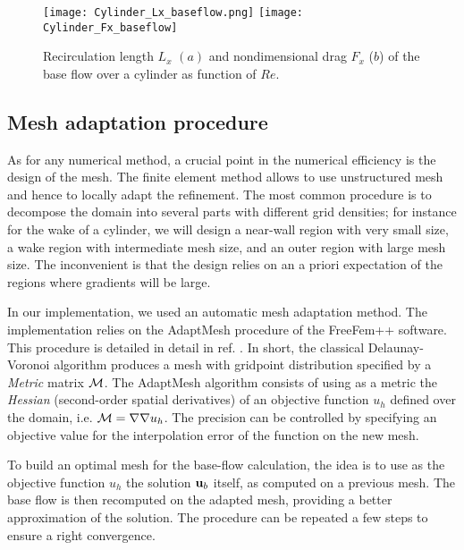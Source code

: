\documentclass[twocolumn,10pt]{asme2ej}
\begin{document}
\begin{figure}
\texttt{[image: Cylinder\_Lx\_baseflow.png]}
\texttt{[image: Cylinder\_Fx\_baseflow]}
\caption{Recirculation length $L_x$ $(a)$  and nondimensional drag $F_x$ ($b$) of the base flow over a cylinder as function of $Re$.}
\label{fig:LxandDrag}
\end{figure}




\subsection{Mesh adaptation procedure}
\vspace{.2cm}

As for any numerical method, a crucial point in the numerical efficiency is the design of the mesh. The finite element method allows to use unstructured mesh and hence to locally adapt the refinement. %
The most common procedure is to decompose the domain into several parts with different grid densities; for instance for the wake of a cylinder, we will design a near-wall region with very small  size, a wake region with intermediate mesh size, and an outer region with large mesh size. The inconvenient is that the design relies on an a priori expectation of the regions where gradients will be large. 

In our implementation, we used an automatic mesh adaptation method. %
The implementation relies on the AdaptMesh procedure of the FreeFem++ software. This procedure is detailed in detail in ref. \cite{adapt}. 
In short, the classical Delaunay-Voronoi algorithm produces a mesh with gridpoint distribution specified by a {\em Metric } matrix $\cal M$. The AdaptMesh algorithm consists of using as a metric the {\em Hessian} (second-order spatial derivatives) of an objective function $u_h$ defined over the domain, i.e. ${\cal M} = \nabla \nabla u_h$. The precision can be controlled by specifying an objective value for the interpolation error of the function on the new mesh.

To build an optimal mesh for the base-flow calculation, the idea is to use as the objective function $u_h$ the solution ${\bf u}_b$ itself, as computed on a previous mesh.%
The base flow is then recomputed on the adapted mesh, providing a better approximation of the solution. The procedure can be repeated a few steps to ensure a right convergence.
\end{document}

